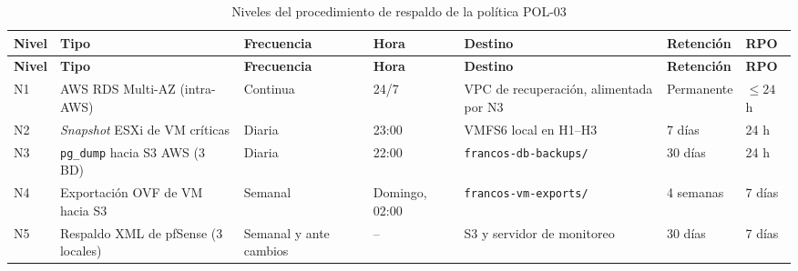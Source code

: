 \documentclass[11pt, a4paper, oneside]{report}
\begin{document}
\begin{xltabular}{\textwidth}{@{}|L{1.1cm}|L{3.6cm}|L{1.6cm}|L{1.3cm}|L{2.6cm}|L{1.4cm}|L{1cm}|@{}}
\caption{Niveles del procedimiento de respaldo de la política POL-03}
\label{tab:pol03_niveles_respaldo} \\

\parbox[c][1.1cm][c]{\linewidth}{\centering\color{white}\bfseries\small Nivel} &
\parbox[c][1.1cm][c]{\linewidth}{\centering\color{white}\bfseries\small Tipo} &
\parbox[c][1.1cm][c]{\linewidth}{\centering\color{white}\bfseries\small Frecuencia} &
\parbox[c][1.1cm][c]{\linewidth}{\centering\color{white}\bfseries\small Hora} &
\parbox[c][1.1cm][c]{\linewidth}{\centering\color{white}\bfseries\small Destino} &
\parbox[c][1.1cm][c]{\linewidth}{\centering\color{white}\bfseries\small Retención} &
\parbox[c][1.1cm][c]{\linewidth}{\centering\color{white}\bfseries\small RPO} \\ \hline
\endfirsthead

\parbox[c][1.1cm][c]{\linewidth}{\centering\color{white}\bfseries\small Nivel} &
\parbox[c][1.1cm][c]{\linewidth}{\centering\color{white}\bfseries\small Tipo} &
\parbox[c][1.1cm][c]{\linewidth}{\centering\color{white}\bfseries\small Frecuencia} &
\parbox[c][1.1cm][c]{\linewidth}{\centering\color{white}\bfseries\small Hora} &
\parbox[c][1.1cm][c]{\linewidth}{\centering\color{white}\bfseries\small Destino} &
\parbox[c][1.1cm][c]{\linewidth}{\centering\color{white}\bfseries\small Retención} &
\parbox[c][1.1cm][c]{\linewidth}{\centering\color{white}\bfseries\small RPO} \\ \hline
\endhead

\hline
\endfoot

{\small N1} & {\small AWS RDS Multi-AZ (intra-AWS)} & {\small Continua} & {\small 24/7} & {\small VPC de recuperación, alimentada por N3} & {\small Permanente} & {\small \(\leq 24\) h} \\ \hline
{\small N2} & {\small \textit{Snapshot} ESXi de VM críticas} & {\small Diaria} & {\small 23:00} & {\small VMFS6 local en H1--H3} & {\small 7 días} & {\small 24 h} \\ \hline
{\small N3} & {\small \texttt{pg\_dump} hacia S3 AWS (3 BD)} & {\small Diaria} & {\small 22:00} & {\small \texttt{francos-db-backups/}} & {\small 30 días} & {\small 24 h} \\ \hline
{\small N4} & {\small Exportación OVF de VM hacia S3} & {\small Semanal} & {\small Domingo, 02:00} & {\small \texttt{francos-vm-exports/}} & {\small 4 semanas} & {\small 7 días} \\ \hline
{\small N5} & {\small Respaldo XML de pfSense (3 locales)} & {\small Semanal y ante cambios} & {\small --} & {\small S3 y servidor de monitoreo} & {\small 30 días} & {\small 7 días} \\ \hline

\end{xltabular}
\end{document}
